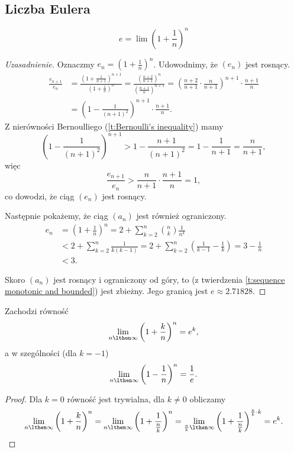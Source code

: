 \documentclass[11pt]{scrartcl}
\begin{document}
    \subsection{Liczba Eulera}
    \begin{definition}
        \[ e = \lim \left(1 + \frac{1}{n}\right)^n \]
    \end{definition}
    \begin{proof}[Uzasadnienie]
        Oznaczmy $e_n = \left(1 + \frac{1}{n}\right)^n$. Udowodnimy, że $(e_n)$ jest rosnący.
        \[\begin{aligned}
            \frac{e_{n+1}}{e_n} &= \frac{\left(1 + \frac{1}{n+1}\right)^{n + 1}}{\left(1 + \frac{1}{n}\right)^n} = \frac{\left(\frac{n+ 2}{n+1}\right)^n}{\left(\frac{n+1}{n}\right)^{n+1}} = \left(\frac{n+2}{n+1} \cdot \frac{n}{n+1}\right)^{n+1} \cdot \frac{n+1}{n} \\
            &= \left(1 - \frac{1}{(n+1)^2}\right)^{n+1} \cdot \frac{n+1}{n}.
        \end{aligned}\]
        Z nierówności Bernoulliego (\ref{t:Bernoulli's inequality}) mamy
        \[ \left(1 - \frac{1}{(n+1)^2}\right)^{n+1} > 1 - \frac{n+1}{(n+1)^2} = 1 - \frac{1}{n+1} = \frac{n}{n+1}, \]
        więc
        \[ \frac{e_{n+1}}{e_n} > \frac{n}{n+1} \cdot \frac{n+1}{n} = 1, \]
        co dowodzi, że ciąg $(e_n)$ jest rosnący.

        Następnie pokażemy, że ciąg $(a_n)$ jest również ograniczony.
        \[\begin{aligned}
            e_n &= \left(1 + \frac{1}{n}\right)^n = 2 + \sum_{k=2}^n\binom{n}{k}\frac{1}{n^k} \\
            &< 2 + \sum_{k=2}^n\frac{1}{k(k-1)} = 2 + \sum_{k=2}^n\left(\frac{1}{k-1} - \frac{1}{k}\right) = 3 - \frac{1}{n} \\
            &< 3.
        \end{aligned}\]

        Skoro $(a_n)$ jest rosnący i ograniczony od góry, to (z twierdzenia \ref{t:sequence monotonic and bounded}) jest zbieżny. Jego granicą jest $e \approx 2.71828$.
    \end{proof}

    \begin{lemma}
        \label{l:lim e^k}
        Zachodzi równość
        \[ \lim_{n\lthen\infty}\left(1 + \frac{k}{n}\right)^n = e^k, \]
        a w szególności (dla $k = -1$)
        \[ \lim_{n\lthen\infty}\left(1 - \frac{1}{n}\right)^n = \frac{1}{e}. \]
    \end{lemma}
    \begin{proof}
        Dla $k = 0$ równość jest trywialna, dla $k \neq 0$ obliczamy
        \[ \lim_{n\lthen\infty}\left(1 + \frac{k}{n}\right)^n = \lim_{n\lthen\infty}\left(1 + \frac{1}{\frac{n}{k}}\right)^n = \lim_{\frac{n}{k}\lthen\infty}\left(1 + \frac{1}{\frac{n}{k}}\right)^{\frac{n}{k} \cdot k} = e^k. \]
    \end{proof}
\end{document}
